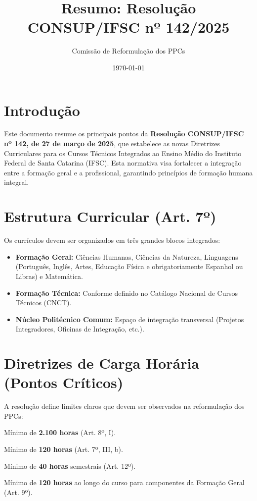 \documentclass[a4paper,12pt]{article}
\title{\textbf{Resumo: Resolução CONSUP/IFSC nº 142/2025}}
\author{Comissão de Reformulação dos PPCs}
\date{\today}
\begin{document}
\maketitle

\section{Introdução}
Este documento resume os principais pontos da \textbf{Resolução CONSUP/IFSC nº 142, de 27 de março de 2025}, que estabelece as novas Diretrizes Curriculares para os Cursos Técnicos Integrados ao Ensino Médio do Instituto Federal de Santa Catarina (IFSC). Esta normativa visa fortalecer a integração entre a formação geral e a profissional, garantindo princípios de formação humana integral.

\section{Estrutura Curricular (Art. 7º)}
Os currículos devem ser organizados em três grandes blocos integrados:
\begin{itemize}
    \item \textbf{Formação Geral:} Ciências Humanas, Ciências da Natureza, Linguagens (Português, Inglês, Artes, Educação Física e obrigatoriamente Espanhol ou Libras) e Matemática.
    \item \textbf{Formação Técnica:} Conforme definido no Catálogo Nacional de Cursos Técnicos (CNCT).
    \item \textbf{Núcleo Politécnico Comum:} Espaço de integração transversal (Projetos Integradores, Oficinas de Integração, etc.).
\end{itemize}

\section{Diretrizes de Carga Horária (Pontos Críticos)}
A resolução define limites claros que devem ser observados na reformulação dos PPCs:

\begin{tcolorbox}[colback=blue!5!white,colframe=blue!75!black,title=Cargas Horárias Mínimas]
\begin{description}[leftmargin=!,labelwidth=5cm]
    \item[Formação Geral:] Mínimo de \textbf{2.100 horas} (Art. 8º, I).
    \item[Núcleo Politécnico:] Mínimo de \textbf{120 horas} (Art. 7º, III, b).
    \item[Unidade Curricular:] Mínimo de \textbf{40 horas} semestrais (Art. 12º).
    \item[Componente Curricular (Soma):] Mínimo de \textbf{120 horas} ao longo do curso para componentes da Formação Geral (Art. 9º).
\end{description}
\end{tcolorbox}
\end{document}
